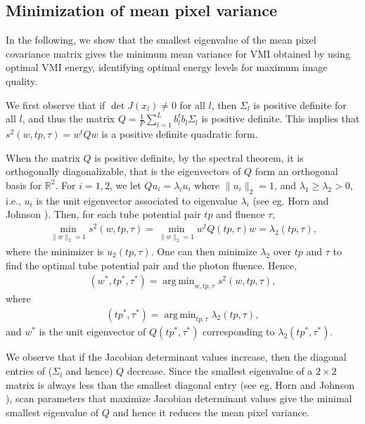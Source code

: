 \documentclass[12pt,twoside]{article}   %
\DeclareMathOperator*{\argmin}{arg\,min}
\def\R{\mathbb{R}}
\def\S{\Sigma}
\begin{document}
\subsection{Minimization of mean pixel variance} \label{sec:maxCNR}
In the following, we show that the smallest eigenvalue of the mean pixel covariance matrix gives the minimum mean variance for VMI obtained by using optimal VMI energy, identifying optimal energy levels for maximum image quality.

We first observe that if $\det J(x_l) \neq 0$ for all $l$, then $\S_l$ is positive definite for all $l$, and thus the matrix $Q=\textstyle \frac{1}{P} \sum_{l=1}^Lb_l^tb_l \S_l$ is positive definite. This implies that $s^2(w,tp,\tau)=w^t Q w$ is a positive definite quadratic form.

When the matrix $Q$ is positive definite, by the spectral theorem, it is orthogonally diagonalizable, that is the eigenvectors of $Q$ form an orthogonal basis for $\R^2$.
For $i=1,2$, we let $Qu_i=\lambda_i u_i$ where $\|u_i\|_2=1$, and $\lambda_1 \geq \lambda_2 > 0$, i.e., $u_i$ is the unit eigenvector associated to eigenvalue $\lambda_i$ (see eg. Horn and Johnson \cite{Horn}). Then, for each tube potential pair $tp$ and fluence $\tau$,
\begin{align}\label{min_w}
\min_{\|w\|_2=1} s^2(w,tp,\tau) = \min_{\|w\|_2=1} w^t Q(tp,\tau) w = \lambda_2(tp,\tau), 
\end{align}
where the minimizer is $u_2(tp,\tau)$. One can then minimize $\lambda_2$ over $tp$ and $\tau$ to find the optimal tube potential pair and the photon fluence. Hence, 
\begin{align}\label{thm1}
(w^*,tp^*,\tau^*)= \argmin_{w,tp,\tau} s^2(w,tp,\tau),
\end{align}
where 
\begin{align}
    (tp^*,\tau^*)= \argmin_{tp,\tau} \lambda_2(tp,\tau),
\end{align}
and $w^*$ is the unit eigenvector of $Q(tp^*,\tau^*)$ corresponding to $\lambda_2(tp^*,\tau^*)$.

We observe that if the Jacobian determinant values increase, then the diagonal entries of ($\S_l$ and hence) $Q$ decrease. Since the smallest eigenvalue of a $2\times2$ matrix is always less than the smallest diagonal entry (see eg. Horn and Johnson \cite{Horn}), scan parameters that maximize Jacobian determinant values give the minimal smallest eigenvalue of $Q$ and hence it reduces the mean pixel variance.
\end{document}
